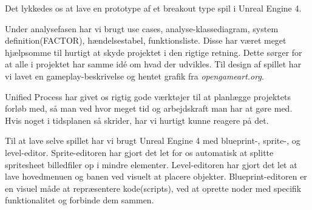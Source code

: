 
Det lykkedes os at lave en prototype af et breakout type spil i Unreal Engine 4.

Under analysefasen har vi brugt use cases, analyse-klassediagram, system definition(FACTOR), hændelsestabel, funktionsliste. Disse har været meget hjælpsomme til hurtigt at skyde projektet i den rigtige retning. Dette sørger for at alle i projektet har samme idé om hvad der udvikles.
Til design af spillet har vi lavet en gameplay-beskrivelse og hentet grafik fra \textit{opengameart.org}.

Unified Process har givet os rigtig gode værktøjer til at planlægge projektets forløb med, så man ved hvor meget tid og arbejdskraft man har at gøre med. Hvis noget i tidsplanen så skrider, har vi hurtigt kunne reagere på det.

Til at lave selve spillet har vi brugt Unreal Engine 4 med blueprint-, sprite-, og level-editor. Sprite-editoren har gjort det let for os automatisk at splitte spritesheet billedfiler op i mindre elementer. Level-editoren har gjort det let at lave hovedmenuen og banen ved visuelt at placere objekter. Blueprint-editoren er en visuel måde at repræsentere kode(scripts), ved at oprette noder med specifik funktionalitet og forbinde dem sammen.